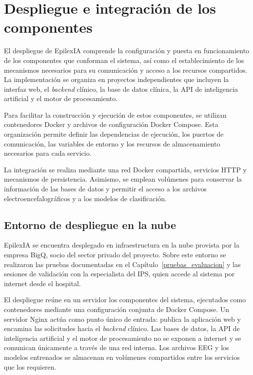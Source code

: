 \section{Despliegue e integración de los componentes}

El despliegue de EpilexIA comprende la configuración y puesta en
funcionamiento de los componentes que conforman el sistema, así
como el establecimiento de los mecanismos necesarios para su
comunicación y acceso a los recursos compartidos. La implementación
se organiza en proyectos independientes que incluyen la interfaz
web, el \textit{backend} clínico, la base de datos clínica, la API de
inteligencia artificial y el motor de procesamiento.

Para facilitar la construcción y ejecución de estos componentes,
se utilizan contenedores Docker y archivos de configuración
Docker Compose. Esta organización permite definir las dependencias
de ejecución, los puertos de comunicación, las variables de
entorno y los recursos de almacenamiento necesarios para cada
servicio.

La integración se realiza mediante una red Docker compartida,
servicios HTTP y mecanismos de persistencia. Asimismo, se
emplean volúmenes para conservar la información de las bases
de datos y permitir el acceso a los archivos electroencefalográficos
y a los modelos de clasificación.

\subsection{Entorno de despliegue en la nube}
\label{subsec:despliegue-nube}

EpilexIA se encuentra desplegado en infraestructura en la nube provista por la empresa BigQ, socio del sector privado del proyecto.
Sobre este entorno se realizaron las pruebas documentadas en el Capítulo~\ref{pruebas_evaluacion} y las sesiones de validación con la especialista del IPS, quien accede al sistema por internet desde el hospital.

El despliegue reúne en un servidor los componentes del sistema, ejecutados como contenedores mediante una configuración conjunta de Docker Compose.
Un servidor Nginx actúa como punto único de entrada: publica la aplicación web y encamina las solicitudes hacia el \textit{backend} clínico.
Las bases de datos, la API de inteligencia artificial y el motor de procesamiento no se exponen a internet y se comunican únicamente a través de una red interna.
Los archivos EEG y los modelos entrenados se almacenan en volúmenes compartidos entre los servicios que los requieren.

